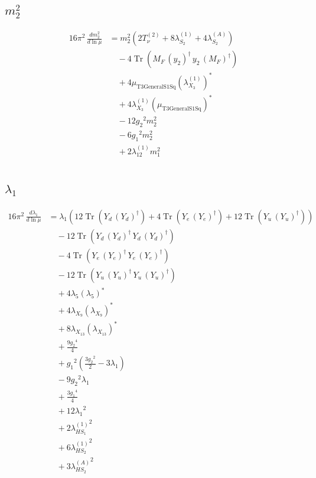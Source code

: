 \documentclass[10pt,a4paper]{article}
\begin{document}
\subsection*{$m_2^2$}
\begin{align*}
16\pi^2\,\frac{d m_2^2}{d\ln\mu} &={m_2^2} (2 T_{\nu}^{(2)}+8 {\lambda_{S_2}^{(1)}}+4 {\lambda_{S_2}^{(A)}}) \\
&\quad -4 \operatorname{Tr}\!\left({M_F}\,\left({y_2}\right)^{\dagger}\,{y_2}\,\left({M_F}\right)^{\dagger}\right) \\
&\quad +4 {\mu_{\mathrm{T3GeneralS1Sq}}} \left({\lambda_{X_{3}}^{(1)}}\right)^{*} \\
&\quad +4 {\lambda_{X_{3}}^{(1)}} \left({\mu_{\mathrm{T3GeneralS1Sq}}}\right)^{*} \\
&\quad -12 {g_2}^2 {m_2^2} \\
&\quad -6 {g_1}^2 {m_2^2} \\
&\quad +2 {\lambda_{12}^{(1)}} {m_1^2} \\
\end{align*}
\subsection*{$\lambda_1$}
\begin{align*}
16\pi^2\,\frac{d \lambda_1}{d\ln\mu} &={\lambda_1} (12 \operatorname{Tr}\!\left({Y_d}\,\left({Y_d}\right)^{\dagger}\right)+4 \operatorname{Tr}\!\left({Y_e}\,\left({Y_e}\right)^{\dagger}\right)+12 \operatorname{Tr}\!\left({Y_u}\,\left({Y_u}\right)^{\dagger}\right)) \\
&\quad -12 \operatorname{Tr}\!\left({Y_d}\,\left({Y_d}\right)^{\dagger}\,{Y_d}\,\left({Y_d}\right)^{\dagger}\right) \\
&\quad -4 \operatorname{Tr}\!\left({Y_e}\,\left({Y_e}\right)^{\dagger}\,{Y_e}\,\left({Y_e}\right)^{\dagger}\right) \\
&\quad -12 \operatorname{Tr}\!\left({Y_u}\,\left({Y_u}\right)^{\dagger}\,{Y_u}\,\left({Y_u}\right)^{\dagger}\right) \\
&\quad +4 {\lambda_5} \left({\lambda_5}\right)^{*} \\
&\quad +4 {\lambda_{X_{9}}} \left({\lambda_{X_{9}}}\right)^{*} \\
&\quad +8 {\lambda_{X_{13}}} \left({\lambda_{X_{13}}}\right)^{*} \\
&\quad +\frac{9 {g_2}^4}{4} \\
&\quad +{g_1}^2 \left(\frac{3 {g_2}^2}{2}-3 {\lambda_1}\right) \\
&\quad -9 {g_2}^2 {\lambda_1} \\
&\quad +\frac{3 {g_1}^4}{4} \\
&\quad +12 {\lambda_1}^2 \\
&\quad +2 {\lambda_{HS_1}^{(1)}}^2 \\
&\quad +6 {\lambda_{HS_2}^{(1)}}^2 \\
&\quad +3 {\lambda_{HS_2}^{(A)}}^2 \\
\end{align*}
\end{document}
